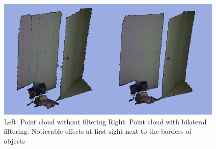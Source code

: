 \begin{figure}[h!]
\begin{center}
\includegraphics[scale=0.25]{images/bilateral}
\end{center}
\caption{Left: Point cloud without filtering Right: Point cloud with bilateral filtering. Noticeable effects at first sight next to the borders of objects}
\end{figure}

